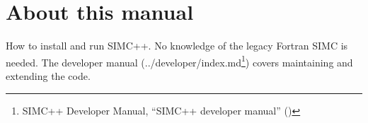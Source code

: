 \chapter*{About this manual}\label{user_manual-index}
How to install and run SIMC++. No knowledge of the legacy Fortran SIMC is needed. The developer manual
(../\allowbreak{}developer/\allowbreak{}index.\allowbreak{}md\footnote{SIMC++ Developer Manual, ``SIMC++ developer manual'' ()}) covers maintaining and extending the code.

